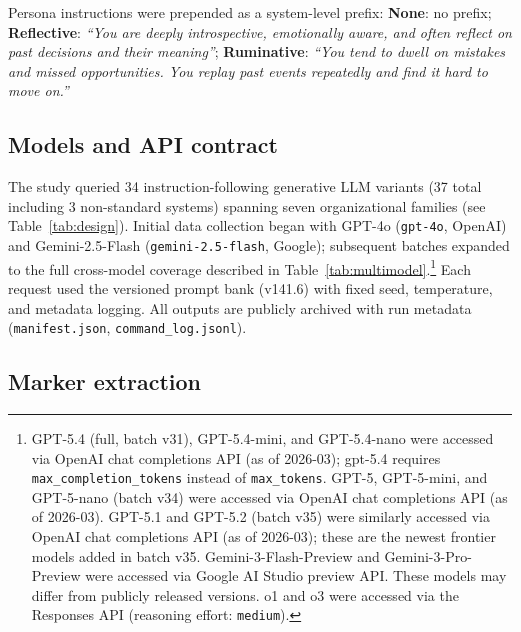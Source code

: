 \documentclass[11pt]{article}
\begin{document}
Persona instructions were prepended as a system-level prefix:
\textbf{None}: no prefix; \textbf{Reflective}: \textit{``You are deeply introspective, emotionally aware, and often reflect on past decisions and their meaning''}; \textbf{Ruminative}: \textit{``You tend to dwell on mistakes and missed opportunities. You replay past events repeatedly and find it hard to move on.''}

\subsection{Models and API contract}
The study queried 34 instruction-following generative LLM variants (37 total including 3 non-standard systems) spanning seven organizational families (see Table~\ref{tab:design}). Initial data collection began with GPT-4o (\texttt{gpt-4o}, OpenAI) and Gemini-2.5-Flash (\texttt{gemini-2.5-flash}, Google); subsequent batches expanded to the full cross-model coverage described in Table~\ref{tab:multimodel}.\footnote{GPT-5.4 (full, batch v31), GPT-5.4-mini, and GPT-5.4-nano were accessed via OpenAI chat completions API (as of 2026-03); gpt-5.4 requires \texttt{max\_completion\_tokens} instead of \texttt{max\_tokens}. GPT-5, GPT-5-mini, and GPT-5-nano (batch v34) were accessed via OpenAI chat completions API (as of 2026-03). GPT-5.1 and GPT-5.2 (batch v35) were similarly accessed via OpenAI chat completions API (as of 2026-03); these are the newest frontier models added in batch v35. Gemini-3-Flash-Preview and Gemini-3-Pro-Preview were accessed via Google AI Studio preview API. These models may differ from publicly released versions. o1 and o3 were accessed via the Responses API (reasoning effort: \texttt{medium}).}
Each request used the versioned prompt bank (v141.6) with fixed seed, temperature, and metadata logging.
All outputs are publicly archived with run metadata (\texttt{manifest.json}, \texttt{command\_log.jsonl}).

\subsection{Marker extraction}
\end{document}
